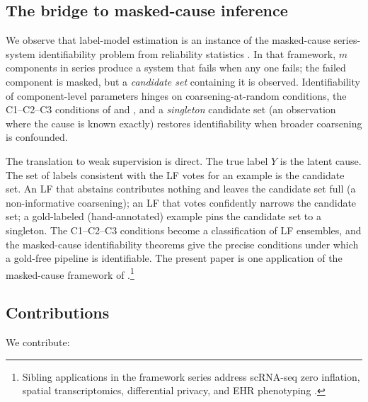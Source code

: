 \subsection{The bridge to masked-cause inference}

We observe that label-model estimation is an instance of the
masked-cause series-system identifiability problem from reliability
statistics \citep{towell2026masked}. In that framework, $m$
components in series produce a system that fails when any one fails;
the failed component is masked, but a \emph{candidate set} containing
it is observed. Identifiability of component-level parameters hinges
on coarsening-at-random conditions, the C1--C2--C3 conditions of
\citet{heitjan1991ignorability} and \citet{gill1997coarsening}, and a
\emph{singleton} candidate set (an observation where the cause is
known exactly) restores identifiability when broader coarsening is
confounded.

The translation to weak supervision is direct. The true label $Y$ is
the latent cause. The set of labels consistent with the LF votes for
an example is the candidate set. An LF that abstains contributes
nothing and leaves the candidate set full (a non-informative
coarsening); an LF that votes confidently narrows the candidate set;
a gold-labeled (hand-annotated) example pins the candidate set to a
singleton. The C1--C2--C3 conditions become a classification of LF
ensembles, and the masked-cause identifiability theorems give the
precise conditions under which a gold-free pipeline is identifiable.
The present paper is one application of the masked-cause framework
of \citet{towell2026masked}.\footnote{Sibling applications in the
framework series address scRNA-seq zero inflation, spatial
transcriptomics, differential privacy, and EHR phenotyping
\citep{towell2026scrnacoarsening,towell2026spatialcoarsening,
towell2026dpcoarsening,towell2026phenotypecoarsening}.}

\subsection{Contributions}

We contribute:

